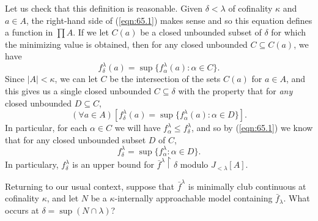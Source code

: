 \documentclass[10pt]{amsart}
\theoremstyle{plain}
\theoremstyle{definition}
\theoremstyle{remark}
\numberwithin{equation}{section}
\begin{document}
Let us check that this definition is reasonable.  Given $\delta<\lambda$ of cofinality $\kappa$ and $a\in A$, the right-hand side
of (\ref{eqn:65.1}) makes sense and so this equation defines a function in $\prod A$. If we let $C(a)$ be a closed unbounded
subset of $\delta$ for which the minimizing value is obtained, then for any closed unbounded $C\subseteq C(a)$, we have
\begin{equation}
f^\lambda_\delta(a) = \sup\{f^\lambda_\alpha(a):\alpha\in C\}.
\end{equation}
Since $|A|<\kappa$, we can let $C$ be the intersection of the sets $C(a)$ for $a\in A$, and this gives us a single closed
unbounded $C\subseteq\delta$ with the property that for {\em any} closed unbounded $D\subseteq C$,
\begin{equation}
(\forall a\in A)\left[f^\lambda_\delta(a) = \sup\{f^\lambda_\alpha(a):\alpha\in D\}\right].
\end{equation}
In particular, for each $\alpha\in C$ we will have $f_\alpha^\lambda\leq f^\lambda_\delta$, and so by (\ref{eqn:65.1}) we know
that for any closed unbounded subset $D$ of $C$,
\begin{equation}
f^\lambda_\delta = \sup\{f^\lambda_\alpha:\alpha\in D\}.
\end{equation}
In particulary, $f^\lambda_\delta$ is an upper bound for $\bar{f}^\lambda\restriction\delta$ modulo $J_{<\lambda}[A]$.

Returning to our usual context, suppose that $\bar{f}^\lambda$ is minimally club continuous at cofinality $\kappa$,
 and let $N$ be a $\kappa$-internally approachable model containing $\bar{f}_\lambda$. What occurs at $\delta = \sup(N\cap\lambda)$?
\end{document}
